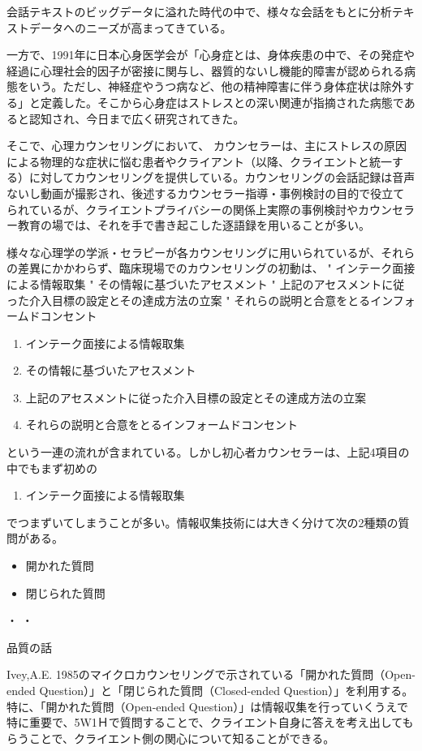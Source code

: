 \documentclass[shuuron]{kuee}
\begin{document}

会話テキストのビッグデータに溢れた時代の中で、様々な会話をもとに分析テキストデータへのニーズが高まってきている。

一方で、1991年に日本心身医学会が「心身症とは、身体疾患の中で、その発症や経過に心理社会的因子が密接に関与し、器質的ないし機能的障害が認められる病態をいう。ただし、神経症やうつ病など、他の精神障害に伴う身体症状は除外する」と定義した。そこから心身症はストレスとの深い関連が指摘された病態であると認知され、今日まで広く研究されてきた。

  そこで、心理カウンセリングにおいて、 カウンセラーは、主にストレスの原因による物理的な症状に悩む患者やクライアント（以降、クライエントと統一する）に対してカウンセリングを提供している。カウンセリングの会話記録は音声ないし動画が撮影され、後述するカウンセラー指導・事例検討の目的で役立てられているが、クライエントプライバシーの関係上実際の事例検討やカウンセラー教育の場では、それを手で書き起こした逐語録を用いることが多い。

様々な心理学の学派・セラピーが各カウンセリングに用いられているが、それらの差異にかかわらず、臨床現場でのカウンセリングの初動は、
"	インテーク面接による情報取集
"	その情報に基づいたアセスメント
"	上記のアセスメントに従った介入目標の設定とその達成方法の立案
"	それらの説明と合意をとるインフォームドコンセント
\begin{enumerate}
 \item インテーク面接による情報取集
 \item その情報に基づいたアセスメント
 \item 上記のアセスメントに従った介入目標の設定とその達成方法の立案
 \item それらの説明と合意をとるインフォームドコンセント
\end{enumerate}
という一連の流れが含まれている。しかし初心者カウンセラーは、上記4項目の中でもまず初めの
\begin{enumerate}
 \item インテーク面接による情報取集
\end{enumerate}
でつまずいてしまうことが多い。情報収集技術には大きく分けて次の2種類の質問がある。
\begin{itemize}
\item 開かれた質問
\item 閉じられた質問
\end{itemize}
・
・


品質の話

Ivey,A.E. 1985のマイクロカウンセリングで示されている「開かれた質問（Open-ended Question）」と「閉じられた質問（Closed-ended Question）」を利用する。特に、「開かれた質問（Open-ended Question）」は情報収集を行っていくうえで特に重要で、5W1Ｈで質問することで、クライエント自身に答えを考え出してもらうことで、クライエント側の関心について知ることができる。　　　　　　　　　　　　　　　　　　　　　　　　　　　　　　　　　　　　　　　　　　　　　　　　　　　　　　　　　　　　　　　　　　　　　　　　　　　　
\end{document}
